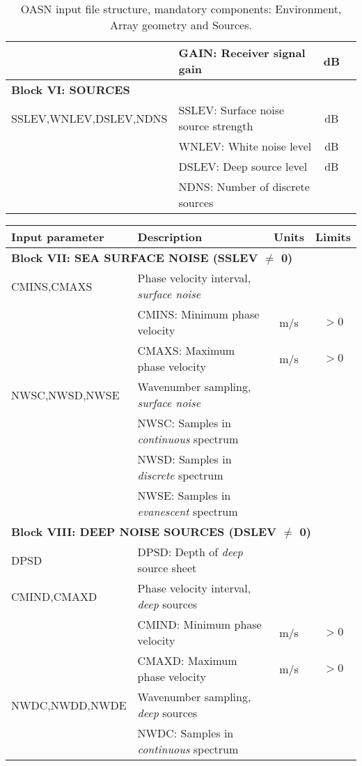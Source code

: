 \begin{table}
\begin{center}
\begin{tabular}{|l|l|c|c|}
	& GAIN: Receiver signal gain & dB & \\ 
\hline
\multicolumn{4}{|l|}{\bf Block VI: SOURCES}  \\ \hline
SSLEV,WNLEV,DSLEV,NDNS & SSLEV: Surface noise source strength & dB & \\
	& WNLEV: White noise level & dB & \\
	& DSLEV: Deep source level & dB & \\
	& NDNS: Number of discrete sources & & \\
\hline
\end{tabular}
\end{center}
\caption{OASN input file structure, mandatory components: Environment, 
Array geometry and Sources.
 \label{tab:oasnI} }
\end{table} 

\begin{table}
\begin{center}
\small
\begin{tabular}{|l|l|c|c|}
\hline \hline
Input parameter & Description & Units & Limits \\
\hline \hline
\multicolumn{4}{|l|}{\bf Block VII: SEA SURFACE NOISE (SSLEV $\neq$ 0)}  \\ 
\hline
CMINS,CMAXS & Phase velocity interval, {\em surface noise} & & \\ 
	& CMINS: Minimum phase velocity & m/s & $>0$ \\
	& CMAXS: Maximum phase velocity & m/s & $>0$ \\
NWSC,NWSD,NWSE & Wavenumber sampling, {\em surface noise} & & \\
	& NWSC: Samples in {\em continuous} spectrum &  &  \\
	& NWSD: Samples in {\em discrete} spectrum &  &  \\
	& NWSE: Samples in {\em evanescent} spectrum &  &  \\
\hline
\multicolumn{4}{|l|}{\bf Block VIII: DEEP NOISE SOURCES (DSLEV $\neq$ 0)}  \\ 
\hline
DPSD 	& DPSD: Depth of {\em deep} source sheet & & \\
CMIND,CMAXD & Phase velocity interval, {\em deep} sources & & \\ 
	& CMIND: Minimum phase velocity & m/s & $>0$ \\
	& CMAXD: Maximum phase velocity & m/s & $>0$ \\
NWDC,NWDD,NWDE & Wavenumber sampling, {\em deep} sources & & \\
	& NWDC: Samples in {\em continuous} spectrum &  &  \\

\end{tabular}
\end{center}
\end{table}
